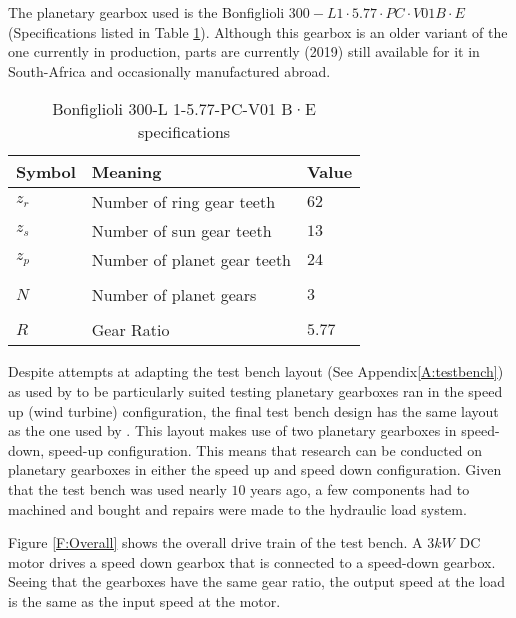 The planetary gearbox used is the Bonfiglioli $300-L 1·5.77·PC·V01 B·E$ (Specifications listed in Table \ref{t:Bonfiglioli}). Although this gearbox is an older variant of the one currently in production, parts are currently (2019) still available for it in South-Africa and occasionally manufactured abroad. 


\begin{table}[H]
	\centering
	\caption{Bonfiglioli 300-L 1-5.77-PC-V01 B·E specifications}
	\label{t:Bonfiglioli}
	\begin{tabular}{@{}lll@{}}
		\toprule
		Symbol & Meaning & Value \\ \midrule
		$z_r$ & Number of ring gear teeth & $62$ \\
		$z_s$ & Number of sun gear teeth & $13$ \\
		$z_p$ & Number of planet gear teeth & $24$ \\
		&  &  \\
		$N$ & Number of planet gears & $3$ \\
		&  &  \\
		$R$& Gear Ratio  & $5.77$  \\\bottomrule
	\end{tabular}
\end{table}


Despite attempts at adapting the test bench layout (See Appendix\ref{A:testbench}) as used by \cite{Smidt2009} to be particularly suited testing planetary gearboxes ran in the speed up (wind turbine) configuration, the final test bench design has the same layout as the one used by \cite{Smidt2009}. This layout makes use of two planetary gearboxes in speed-down, speed-up configuration. This means that research can be conducted on planetary gearboxes in either the speed up and speed down configuration. Given that the test bench was used nearly $10$ years ago, a few components had to machined and bought and repairs were made to the hydraulic load system. 

Figure \ref{F:Overall} shows the overall drive train of the test bench. A $3kW$ DC motor drives a speed down gearbox that is connected to a speed-down gearbox. Seeing that the gearboxes have the same gear ratio, the output speed at the load is the same as the input speed at the motor. 


